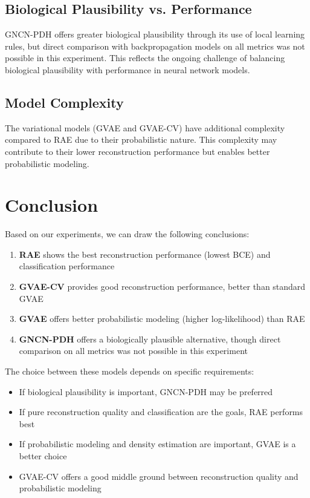 \documentclass[11pt,a4paper]{article}
\begin{document}
\subsection{Biological Plausibility vs. Performance}
GNCN-PDH offers greater biological plausibility through its use of local learning rules, but direct comparison with backpropagation models on all metrics was not possible in this experiment. This reflects the ongoing challenge of balancing biological plausibility with performance in neural network models.

\subsection{Model Complexity}
The variational models (GVAE and GVAE-CV) have additional complexity compared to RAE due to their probabilistic nature. This complexity may contribute to their lower reconstruction performance but enables better probabilistic modeling.

\section{Conclusion}

Based on our experiments, we can draw the following conclusions:

\begin{enumerate}
    \item \textbf{RAE} shows the best reconstruction performance (lowest BCE) and classification performance
    \item \textbf{GVAE-CV} provides good reconstruction performance, better than standard GVAE
    \item \textbf{GVAE} offers better probabilistic modeling (higher log-likelihood) than RAE
    \item \textbf{GNCN-PDH} offers a biologically plausible alternative, though direct comparison on all metrics was not possible in this experiment
\end{enumerate}

The choice between these models depends on specific requirements:
\begin{itemize}
    \item If biological plausibility is important, GNCN-PDH may be preferred
    \item If pure reconstruction quality and classification are the goals, RAE performs best
    \item If probabilistic modeling and density estimation are important, GVAE is a better choice
    \item GVAE-CV offers a good middle ground between reconstruction quality and probabilistic modeling
\end{itemize}
\end{document}
